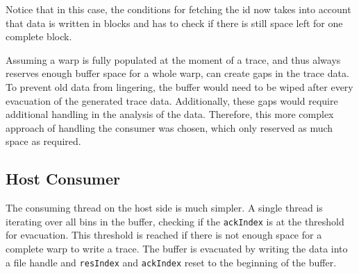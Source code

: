 	Notice that in this case, the conditions for fetching the id now takes into account that data is written in blocks and has to check if there is still space left for one complete block. 
	
	Assuming a warp is fully populated at the moment of a trace, and thus always reserves enough buffer space for a whole warp, can create gaps in the trace data. To prevent old data from lingering, the buffer would need to be wiped after every evacuation of the
	generated trace data. Additionally, these gaps would require additional handling in the analysis of the data.
	Therefore, this more complex approach of handling the consumer was chosen, which only reserved as much space as required.

	
\subsection{Host Consumer}\label{host-cons}
	The consuming thread on the host side is much simpler. A single thread is iterating over all bins in the buffer, checking if the
	\verb|ackIndex| is at the threshold for evacuation. This threshold is reached if there is not enough space for a complete warp to
	write a trace.
	The buffer is evacuated by writing the data into a file handle and \verb|resIndex| and \verb|ackIndex| reset to the beginning of the buffer.

